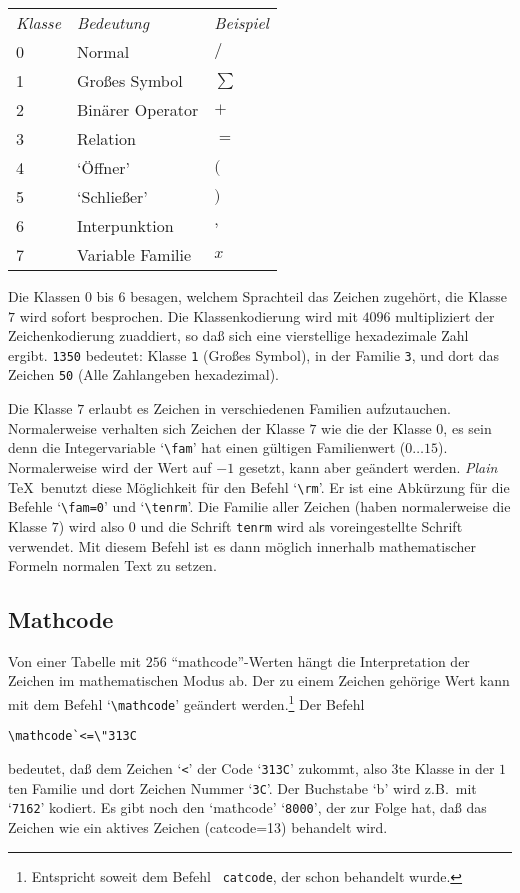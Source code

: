 \medskip\begin{tabular}{lll}
{\em Klasse} & {\em Bedeutung} & {\em Beispiel} \\
0 & Normal & $/$\\
1 & Gro\ss{}es Symbol & $\sum$\\
2 & Bin\"arer Operator & $+$\\
3 & Relation & $=$\\
4 & `\"Offner' & $($\\
5 & `Schlie\ss{}er' & $)$\\
6 & Interpunktion & $,$\\
7 & Variable Familie & $x$
\end{tabular}\medskip

Die Klassen $0$ bis $6$ besagen, welchem Sprachteil das Zeichen
zugeh\"ort, die Klasse $7$ wird sofort besprochen. Die Klassenkodierung
wird mit $4096$ multipliziert der Zeichenkodierung zuaddiert, so da\ss{}
sich eine vierstellige hexadezimale Zahl ergibt. {\tt 1350} bedeutet:
Klasse {\tt 1} (Gro\ss{}es Symbol), in der 
Familie {\tt 3}, und dort das
Zeichen {\tt 50} (Alle Zahlangeben hexadezimal).

Die Klasse $7$ erlaubt es Zeichen in verschiedenen Familien
aufzutauchen. Normalerweise verhalten sich Zeichen der Klasse $7$ wie
die der Klasse $0$, es sein denn die 
Integervariable `\verb|\fam|' hat
einen g\"ultigen Familienwert ($0\ldots15$). Normalerweise wird der Wert
auf $-1$ gesetzt, kann aber ge\"andert werden. {\em Plain} \TeX\ benutzt diese
M\"oglichkeit f\"ur den Befehl 
`\verb|\rm|'. Er ist eine
Abk\"urzung f\"ur die
Befehle `\verb|\fam=0|' und `\verb|\tenrm|'. Die Familie aller Zeichen
(haben normalerweise die Klasse $7$) wird also $0$ und die
Schrift
{\tt tenrm} wird als voreingestellte 
Schrift verwendet. Mit diesem
Befehl ist es dann m\"oglich innerhalb mathematischer Formeln normalen
Text zu setzen.
\subsection{Mathcode}
Von einer Tabelle mit $256$ ``mathcode''-Werten h\"angt die Interpretation
der Zeichen im mathematischen Modus ab. Der zu einem Zeichen geh\"orige Wert kann
mit dem Befehl 
`\verb|\mathcode|' ge\"andert werden.\footnote{Entspricht
soweit dem Befehl {\tt{} catcode}, der schon behandelt wurde.}
Der Befehl
\begin{verbatim}
\mathcode`<=\"313C
\end{verbatim}
bedeutet, da\ss{} dem Zeichen `\verb|<|' der Code `\verb|313C|' zukommt,
also $3$te 
Klasse in der $1$ten Familie und dort Zeichen Nummer
`\verb|3C|'. Der Buchstabe `b' wird z.B.\ mit `\verb|7162|' kodiert.
Es gibt noch den `mathcode' `\verb|8000|', der zur Folge hat, da\ss{} das
Zeichen wie ein 
aktives Zeichen (catcode=13) behandelt wird.

